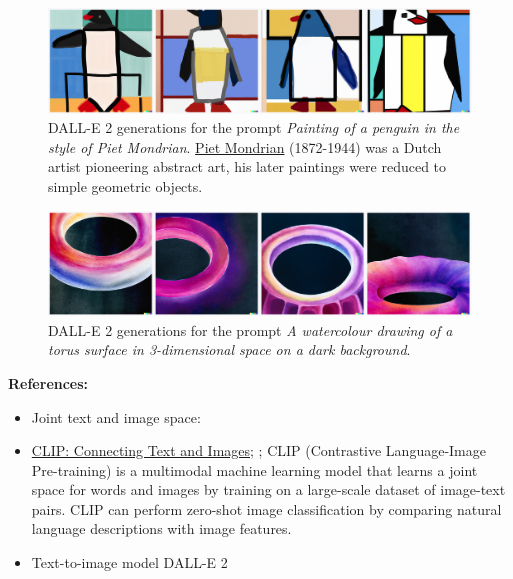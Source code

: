 \documentclass[11pt, a4paper]{amsart}
\begin{document}
\begin{figure}
	\centering
	\includegraphics[width=\linewidth]{figures/text_to_image/DALLE2 Painting of a penguin in the style of Piet Mondrian.png}
	\caption{
		DALL-E 2 generations for the prompt \emph{Painting of a penguin in the style of Piet Mondrian}.
		\href{https://en.wikipedia.org/wiki/Piet_Mondrian}{Piet Mondrian} (1872-1944) was a Dutch artist pioneering abstract art, his later paintings were reduced to simple geometric objects.
	}
	\label{fig:DALLE2_penguin_piet_mondrian}
\end{figure}

\begin{figure}
	\centering
	\includegraphics[width=\linewidth]{figures/text_to_image/DALLE2 A watercolour drawing of a torus surface in 3-dimensional space on a dark background.png}
	\caption{
		DALL-E 2 generations for the prompt \emph{A watercolour drawing of a torus surface in 3-dimensional space on a dark background}.
	}
	\label{fig:DALLE2_watercolour_torus_dark_background}
\end{figure}

\noindent \textbf{References:}
\begin{itemize}
	\item Joint text and image space:
	\cite{DBLP:journals/corr/abs-2111-07180}
	
	\item \href{https://openai.com/blog/clip/}{CLIP: Connecting Text and Images};
	\cite{radford2021learning};
	CLIP (Contrastive Language-Image Pre-training) is a multimodal machine learning model that learns a joint space for words and images by training on a large-scale dataset of image-text pairs.
	CLIP can perform zero-shot image classification by comparing natural language descriptions with image features.
	
	\item Text-to-image model DALL-E 2 \cite{Ramesh2022HierarchicalTI}
\end{itemize}
\end{document}
